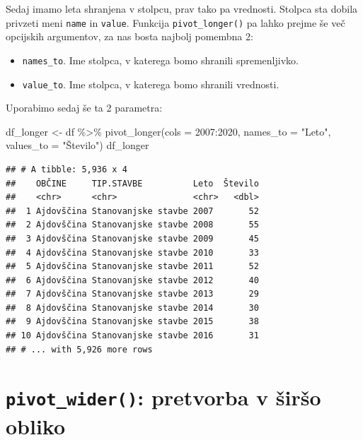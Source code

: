 \documentclass[
]{book}
\newenvironment{Shaded}{\begin{snugshade}}{\end{snugshade}}
\newcommand{\AttributeTok}[1]{\textcolor[rgb]{0.77,0.63,0.00}{#1}}
\newcommand{\FunctionTok}[1]{\textcolor[rgb]{0.00,0.00,0.00}{#1}}
\newcommand{\NormalTok}[1]{#1}
\newcommand{\OtherTok}[1]{\textcolor[rgb]{0.56,0.35,0.01}{#1}}
\newcommand{\SpecialCharTok}[1]{\textcolor[rgb]{0.00,0.00,0.00}{#1}}
\newcommand{\StringTok}[1]{\textcolor[rgb]{0.31,0.60,0.02}{#1}}
\providecommand{\tightlist}{%
  \setlength{\itemsep}{0pt}\setlength{\parskip}{0pt}}
\begin{document}
Sedaj imamo leta shranjena v stolpcu, prav tako pa vrednosti. Stolpca sta dobila privzeti meni \texttt{name} in \texttt{value}. Funkcija \texttt{pivot\_longer()} pa lahko prejme še več opcijskih argumentov, za nas bosta najbolj pomembna 2:

\begin{itemize}
\tightlist
\item
  \texttt{names\_to}. Ime stolpca, v katerega bomo shranili spremenljivko.
\item
  \texttt{value\_to}. Ime stolpca, v katerega bomo shranili vrednosti.
\end{itemize}

Uporabimo sedaj še ta 2 parametra:

\begin{Shaded}
\begin{Highlighting}[]
\NormalTok{df\_longer }\OtherTok{\textless{}{-}}\NormalTok{ df }\SpecialCharTok{\%\textgreater{}\%} \FunctionTok{pivot\_longer}\NormalTok{(}\AttributeTok{cols =} \StringTok{\textasciigrave{}}\AttributeTok{2007}\StringTok{\textasciigrave{}}\SpecialCharTok{:}\StringTok{\textasciigrave{}}\AttributeTok{2020}\StringTok{\textasciigrave{}}\NormalTok{, }
                                 \AttributeTok{names\_to =} \StringTok{"Leto"}\NormalTok{, }
                                 \AttributeTok{values\_to =} \StringTok{"Število"}\NormalTok{)}
\NormalTok{df\_longer}
\end{Highlighting}
\end{Shaded}

\begin{verbatim}
## # A tibble: 5,936 x 4
##    OBČINE     TIP.STAVBE          Leto  Število
##    <chr>      <chr>               <chr>   <dbl>
##  1 Ajdovščina Stanovanjske stavbe 2007       52
##  2 Ajdovščina Stanovanjske stavbe 2008       55
##  3 Ajdovščina Stanovanjske stavbe 2009       45
##  4 Ajdovščina Stanovanjske stavbe 2010       33
##  5 Ajdovščina Stanovanjske stavbe 2011       52
##  6 Ajdovščina Stanovanjske stavbe 2012       40
##  7 Ajdovščina Stanovanjske stavbe 2013       29
##  8 Ajdovščina Stanovanjske stavbe 2014       30
##  9 Ajdovščina Stanovanjske stavbe 2015       38
## 10 Ajdovščina Stanovanjske stavbe 2016       31
## # ... with 5,926 more rows
\end{verbatim}

\hypertarget{pivot_wider-pretvorba-v-ux161irux161o-obliko}{%
\section{\texorpdfstring{\texttt{pivot\_wider()}: pretvorba v širšo obliko}{pivot\_wider(): pretvorba v širšo obliko}}\label{pivot_wider-pretvorba-v-ux161irux161o-obliko}}
\end{document}
